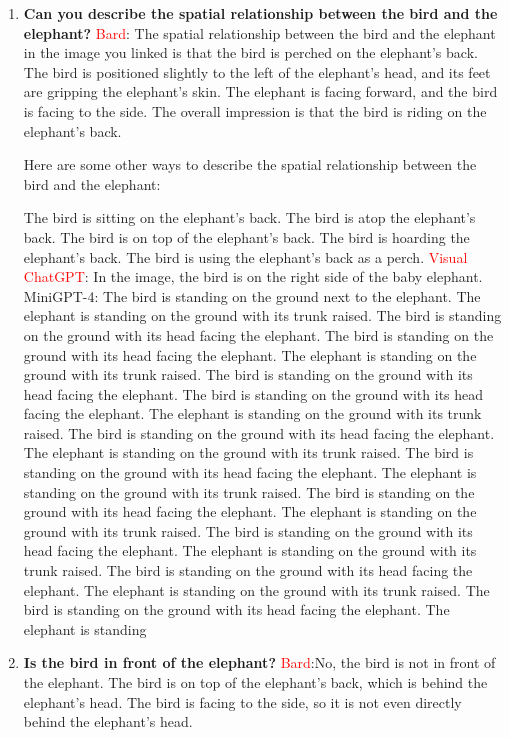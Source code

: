     \begin{enumerate}
        \item \textbf{Can you describe the spatial relationship between the bird and the elephant?}
        \subitem \textcolor{Red}{Bard}:
        The spatial relationship between the bird and the elephant in the image you linked is that the bird is perched on the elephant's back. The bird is positioned slightly to the left of the elephant's head, and its feet are gripping the elephant's skin. The elephant is facing forward, and the bird is facing to the side. The overall impression is that the bird is riding on the elephant's back.
        
        Here are some other ways to describe the spatial relationship between the bird and the elephant:
        
        The bird is sitting on the elephant's back.
        The bird is atop the elephant's back.
        The bird is on top of the elephant's back.
        The bird is hoarding the elephant's back.
        The bird is using the elephant's back as a perch.
        \subitem \textcolor{red}{Visual ChatGPT}: In the image, the bird is on the right side of the baby elephant.
        \subitem MiniGPT-4: The bird is standing on the ground next to the elephant. The elephant is standing on the ground with its trunk raised. The bird is standing on the ground with its head facing the elephant. The bird is standing on the ground with its head facing the elephant. The elephant is standing on the ground with its trunk raised. The bird is standing on the ground with its head facing the elephant. The bird is standing on the ground with its head facing the elephant. The elephant is standing on the ground with its trunk raised. The bird is standing on the ground with its head facing the elephant. The elephant is standing on the ground with its trunk raised. The bird is standing on the ground with its head facing the elephant. The elephant is standing on the ground with its trunk raised. The bird is standing on the ground with its head facing the elephant. The elephant is standing on the ground with its trunk raised. The bird is standing on the ground with its head facing the elephant. The elephant is standing on the ground with its trunk raised. The bird is standing on the ground with its head facing the elephant. The elephant is standing on the ground with its trunk raised. The bird is standing on the ground with its head facing the elephant. The elephant is standing
        \item \textbf{Is the bird in front of the elephant?}
        \subitem \textcolor{Red}{Bard}:No, the bird is not in front of the elephant. The bird is on top of the elephant's back, which is behind the elephant's head. The bird is facing to the side, so it is not even directly behind the elephant's head.


\end{enumerate}
